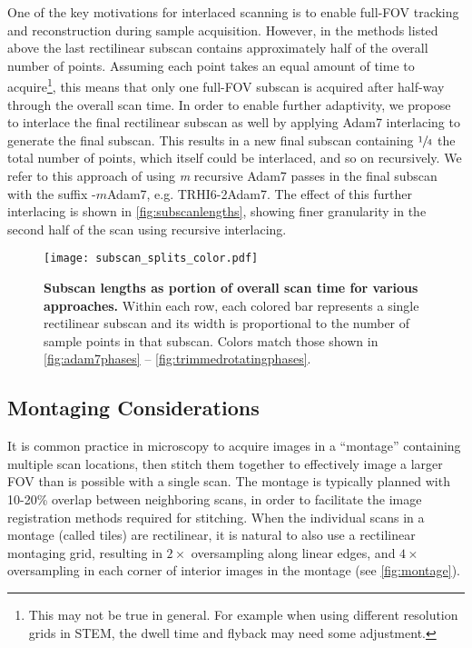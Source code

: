 \documentclass[aip, amsmath, amssymb, nobibnotes, nofootinbib, citeautoscript, reprint, superscriptaddress]{revtex4-2}
\begin{document}
    One of the key motivations for interlaced scanning is to enable full-FOV tracking and reconstruction during sample acquisition.
    However, in the methods listed above the last rectilinear subscan contains approximately half of the overall number of points.
    Assuming each point takes an equal amount of time to acquire\footnote{This may not be true in general. For example when using different resolution grids in STEM, the dwell time and flyback may need some adjustment.}, this means that only one full-FOV subscan is acquired after half-way through the overall scan time.
    In order to enable further adaptivity, we propose to interlace the final rectilinear subscan as well by applying Adam7 interlacing to generate the final subscan.
    This results in a new final subscan containing $\sfrac{1}{4}$ the total number of points, which itself could be interlaced, and so on recursively.
    We refer to this approach of using \textit{m} recursive Adam7 passes in the final subscan with the suffix -$\mathit{m}$Adam7, e.g. TRHI6-2Adam7.
    The effect of this further interlacing is shown in \autoref{fig:subscanlengths}, showing finer granularity in the second half of the scan using recursive interlacing.

    \begin{figure}
        \texttt{[image: subscan\_splits\_color.pdf]}
        \caption{
            \label{fig:subscanlengths} 
            \textbf{Subscan lengths as portion of overall scan time for various approaches.} 
            Within each row, each colored bar represents a single rectilinear subscan and its width is proportional to the number of sample points in that subscan. 
            Colors match those shown in \autoref{fig:adam7phases} -- \autoref{fig:trimmedrotatingphases}.
            }
    \end{figure}

    \subsection{\label{ssec:montaging}Montaging Considerations}

    It is common practice in microscopy to acquire images in a ``montage'' containing multiple scan locations, then stitch them together to
    effectively image a larger FOV than is possible with a single scan.
    The montage is typically planned with 10-20\% overlap between neighboring scans, in order to facilitate the image registration methods required for stitching.
    When the individual scans in a montage (called tiles) are rectilinear, it is natural to also use a rectilinear montaging grid, resulting in $2\times$ oversampling along linear edges, and $4\times$ oversampling in each corner of interior images in the montage (see \autoref{fig:montage}).
\end{document}

